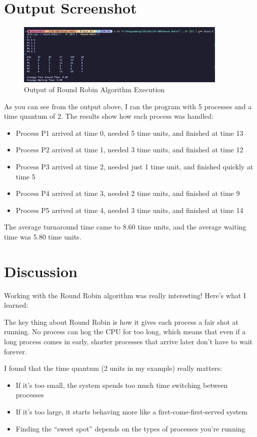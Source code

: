 \documentclass[12pt,a4paper]{article}
\begin{document}
\section{Output Screenshot}

\begin{figure}[H]
    \centering
    \includegraphics[width=0.9\textwidth]{Screenshot 2025-07-29 004149.png}
    \caption{Output of Round Robin Algorithm Execution}
    \label{fig:output}
\end{figure}

As you can see from the output above, I ran the program with 5 processes and a time quantum of 2. The results show how each process was handled:

\begin{itemize}
    \item Process P1 arrived at time 0, needed 5 time units, and finished at time 13
    \item Process P2 arrived at time 1, needed 3 time units, and finished at time 12
    \item Process P3 arrived at time 2, needed just 1 time unit, and finished quickly at time 5
    \item Process P4 arrived at time 3, needed 2 time units, and finished at time 9
    \item Process P5 arrived at time 4, needed 3 time units, and finished at time 14
\end{itemize}

The average turnaround time came to 8.60 time units, and the average waiting time was 5.80 time units.\section{Discussion}
Working with the Round Robin algorithm was really interesting! Here's what I learned:

The key thing about Round Robin is how it gives each process a fair shot at running. No process can hog the CPU for too long, which means that even if a long process comes in early, shorter processes that arrive later don't have to wait forever.

I found that the time quantum (2 units in my example) really matters:
\begin{itemize}
    \item If it's too small, the system spends too much time switching between processes
    \item If it's too large, it starts behaving more like a first-come-first-served system
    \item Finding the ``sweet spot'' depends on the types of processes you're running
\end{itemize}
\end{document}
